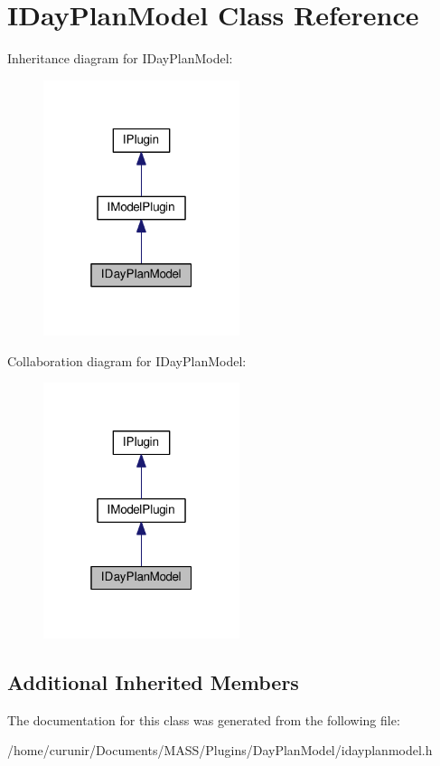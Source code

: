 \hypertarget{class_i_day_plan_model}{}\section{I\+Day\+Plan\+Model Class Reference}
\label{class_i_day_plan_model}


Inheritance diagram for I\+Day\+Plan\+Model\+:\nopagebreak
\begin{figure}[H]
\begin{center}
\leavevmode
\includegraphics[width=163pt]{class_i_day_plan_model__inherit__graph}
\end{center}
\end{figure}


Collaboration diagram for I\+Day\+Plan\+Model\+:\nopagebreak
\begin{figure}[H]
\begin{center}
\leavevmode
\includegraphics[width=163pt]{class_i_day_plan_model__coll__graph}
\end{center}
\end{figure}
\subsection*{Additional Inherited Members}


The documentation for this class was generated from the following file\+:\begin{DoxyCompactItemize}
\item 
/home/curunir/\+Documents/\+M\+A\+S\+S/\+Plugins/\+Day\+Plan\+Model/idayplanmodel.\+h\end{DoxyCompactItemize}
